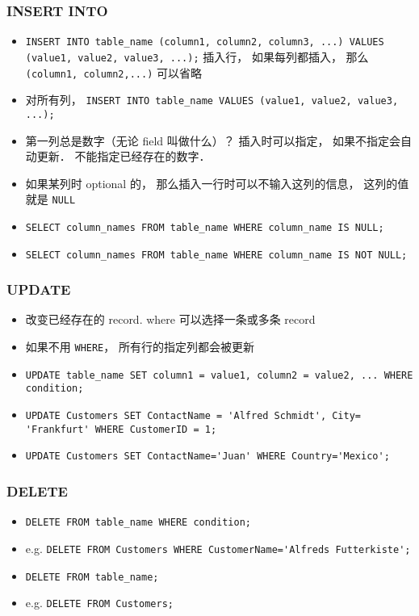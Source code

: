 \subsubsection{INSERT INTO}
\begin{itemize}
\item \verb`INSERT INTO table_name (column1, column2, column3, ...) VALUES (value1, value2, value3, ...);` 插入行， 如果每列都插入， 那么 \verb`(column1, column2,...)` 可以省略
\item 对所有列， \verb`INSERT INTO table_name VALUES (value1, value2, value3, ...);`
\item 第一列总是数字（无论 field 叫做什么）？ 插入时可以指定，  如果不指定会自动更新． 不能指定已经存在的数字．
\item 如果某列时 optional 的， 那么插入一行时可以不输入这列的信息， 这列的值就是 \verb`NULL`
\item \verb`SELECT column_names FROM table_name WHERE column_name IS NULL;`
\item \verb`SELECT column_names FROM table_name WHERE column_name IS NOT NULL;`
\end{itemize}

\subsubsection{UPDATE}
\begin{itemize}
\item 改变已经存在的 record. where 可以选择一条或多条 record
\item 如果不用 \verb`WHERE`， 所有行的指定列都会被更新
\item \verb`UPDATE table_name SET column1 = value1, column2 = value2, ... WHERE condition;`
\item \verb`UPDATE Customers SET ContactName = 'Alfred Schmidt', City= 'Frankfurt' WHERE CustomerID = 1;`
\item \verb`UPDATE Customers SET ContactName='Juan' WHERE Country='Mexico';`
\end{itemize}

\subsubsection{DELETE}
\begin{itemize}
\item \verb`DELETE FROM table_name WHERE condition;`
\item e.g. \verb`DELETE FROM Customers WHERE CustomerName='Alfreds Futterkiste';`
\item \verb`DELETE FROM table_name;`
\item e.g. \verb`DELETE FROM Customers;`
\end{itemize}
